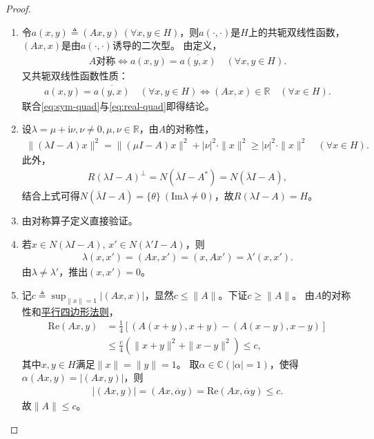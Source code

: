 \documentclass[../../main.tex]{subfiles}%
\begin{document}
\begin{proof}
\begin{enumerate}[(1)]
\item 令$a(x,y)\triangleq(Ax,y)\ (\forall x,y\in H)$，则$a(\cdot,\cdot)$是$H$上的共轭双线性函数，$(Ax,x)$是由$a(\cdot,\cdot)$诱导的二次型。
由定义，
\begin{align}
A\text{对称}\iff a(x,y)=\overline{a(y,x)}\quad(\forall x,y\in H).\label{eq:sym-quad}
\end{align}
又共轭双线性函数性质：
\begin{align}
a(x,y)=\overline{a(y,x)}\quad(\forall x,y\in H)\iff(Ax,x)\in\mathbb{R}\quad(\forall x\in H).\label{eq:real-quad}
\end{align}
联合\eqref{eq:sym-quad}与\eqref{eq:real-quad}即得结论。

\item 设$\lambda=\mu+\mathrm{i}\nu,\nu\neq0,\mu,\nu\in\mathbb{R}$，由$A$的对称性，
\begin{align*}
\|(\lambda I-A)x\|^2=\|(\mu I-A)x\|^2+|\nu|^2\cdot\|x\|^2
\geqslant|\nu|^2\cdot\|x\|^2\quad(\forall x\in H).
\end{align*}
此外，
\begin{align*}
R(\lambda I-A)^\perp=N(\overline{\lambda}I-A^*)=N(\overline{\lambda}I-A),
\end{align*}
结合上式可得$N(\overline{\lambda}I-A)=\{\theta\}\ (\mathrm{Im}\lambda\neq0)$，故$R(\lambda I-A)=H$。

\item 由对称算子定义直接验证。

\item 若$x\in N(\lambda I-A),\,x'\in N(\lambda'I-A)$，则
\begin{align*}
\lambda(x,x')=(Ax,x')=(x,Ax')=\lambda'(x,x').
\end{align*}
由$\lambda\neq\lambda'$，推出$(x,x')=0$。

\item 记$\displaystyle c\triangleq\sup_{\|x\|=1}|(Ax,x)|$，显然$c\leqslant\|A\|$。下证$c\geqslant\|A\|$。
由$A$的对称性和\hyperref[proposition:平行四边形等式--泛函分析]{平行四边形法则}，
\begin{align*}
\mathrm{Re}(Ax,y)&=\frac{1}{4}\left[(A(x+y),x+y)-(A(x-y),x-y)\right]\\
&\leqslant\frac{c}{4}\left(\|x+y\|^2+\|x-y\|^2\right)\leqslant c,
\end{align*}
其中$x,y\in H$满足$\|x\|=\|y\|=1$。
取$\alpha\in\mathbb{C}(|\alpha|=1)$，使得$\alpha(Ax,y)=|(Ax,y)|$，则
\begin{align*}
|(Ax,y)|=(Ax,\overline{\alpha}y)=\mathrm{Re}(Ax,\overline{\alpha}y)\leqslant c.
\end{align*}
故$\|A\|\leqslant c$。
\end{enumerate}
\end{proof}
\end{document}
